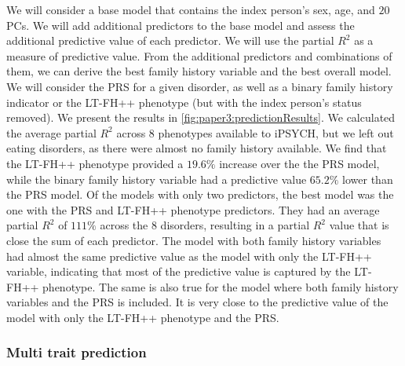 We will consider a base model that contains the index person's sex, age, and $ 20 $ PCs. We will add additional predictors to the base model and assess the additional predictive value of each predictor. We will use the partial $ R^2 $ as a measure of predictive value. From the additional predictors and combinations of them, we can derive the best family history variable and the best overall model. We will consider the PRS for a given disorder, as well as a binary family history indicator or the LT-FH++ phenotype (but with the index person's status removed). We present the results in \cref{fig:paper3:predictionResults}. We calculated the average partial $ R^2 $ across $ 8 $ phenotypes available to iPSYCH, but we left out eating disorders, as there were almost no family history available. We find that the LT-FH++ phenotype provided a $ 19.6\% $ increase over the the PRS model, while the binary family history variable had a predictive value $ 65.2\% $ lower than the PRS model. Of the models with only two predictors, the best model was the one with the PRS and LT-FH++ phenotype predictors. They had an average partial $ R^2 $ of $ 111\% $ across the $ 8 $ disorders, resulting in a partial $ R^2 $ value that is close the sum of each predictor. The model with both family history variables had almost the same predictive value as the model with only the LT-FH++ variable, indicating that most of the predictive value is captured by the LT-FH++ phenotype. The same is also true for the model where both family history variables and the PRS is included. It is very close to the predictive value of the model with only the LT-FH++ phenotype and the PRS.

\subsubsection{Multi trait prediction}

